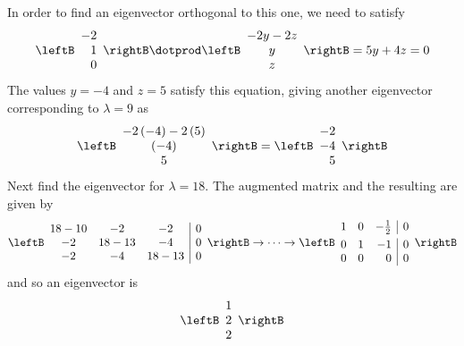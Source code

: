 \begin{solution}
In order to find an eigenvector orthogonal to this one, we need to satisfy 
\begin{equation*}
\leftB
\begin{array}{r}
-2 \\ 
1 \\ 
0
\end{array}
\rightB \dotprod \leftB
\begin{array}{c}
-2y-2z \\ 
y \\ 
z
\end{array}
\rightB =5y+4z=0
\end{equation*}
The values $y=-4$ and $z=5$ satisfy this equation, giving another eigenvector
corresponding to $\lambda=9$ as 
\begin{equation*}
\leftB
\begin{array}{c}
-2\left( -4\right) -2\left( 5\right) \\ 
\left( -4\right) \\ 
5
\end{array}
\rightB =\leftB
\begin{array}{r}
-2 \\ 
-4 \\ 
5
\end{array}
\rightB
\end{equation*}
Next find the eigenvector for $\lambda =18.$ The augmented matrix and the resulting \rref \;are given by  
\begin{equation*}
\leftB
\begin{array}{ccc|c}
18-10 & -2 & -2 & 0 \\ 
-2 & 18-13 & -4 & 0 \\ 
-2 & -4 & 18-13 & 0
\end{array}
\rightB
\rightarrow \cdots \rightarrow
\leftB
\begin{array}{rrr|r}
1 & 0 & -\vspace{0.05in}\frac{1}{2} & 0 \\ 
0 & 1 & -1 & 0 \\ 
0 & 0 & 0 & 0
\end{array}
\rightB
\end{equation*}
and so an eigenvector is 
\begin{equation*}
\leftB
\begin{array}{r}
1 \\ 
2 \\ 
2
\end{array}
\rightB
\end{equation*}


\end{solution}
